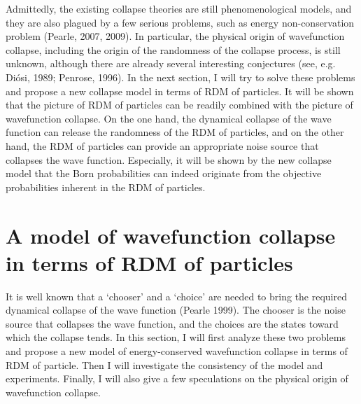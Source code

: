 Admittedly, the existing collapse theories are still phenomenological models, and they are also plagued by a few serious problems, such as energy non-conservation problem (Pearle, 2007, 2009). In particular, the physical origin of wavefunction collapse, including the origin of the randomness of the collapse process, is still unknown, although there are already several interesting conjectures (see, e.g. Di\'{o}si, 1989; Penrose, 1996).
In the next section, I will try to solve these problems and propose a new collapse model in terms of RDM of particles. 
It will be shown that the picture of RDM of particles can be readily combined with the picture of wavefunction collapse. 
On the one hand, the dynamical collapse of the wave function can release the randomness of the RDM of particles, and on the other hand, the RDM of particles can provide an appropriate noise source that collapses the wave function. Especially, it will be shown by the new collapse model that the Born probabilities can indeed originate from the objective probabilities inherent in the RDM of particles.


\section{A model of wavefunction collapse in terms of RDM of particles}

It is well known that a `chooser' and a `choice' are needed to bring the required dynamical collapse of the wave function (Pearle 1999). The chooser is the noise source that collapses the wave function, and the choices are the states toward which the collapse tends. In this section, I will first analyze these two problems and 
propose a new model of energy-conserved wavefunction collapse in terms of RDM of particle. Then I will investigate the consistency of the model and experiments. Finally, I will also give a few speculations on the physical origin of wavefunction collapse. 

